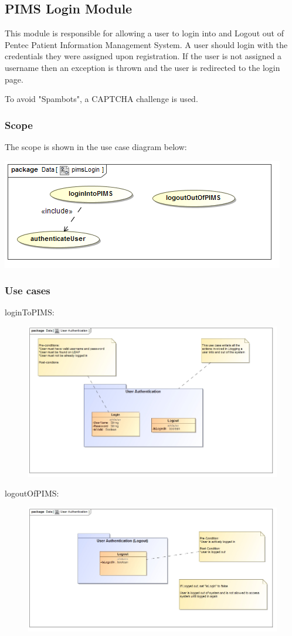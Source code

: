 \subsection{PIMS Login Module}
This module is responsible for allowing a user to login into and Logout out of Pentec Patient Information Management System. A user should login with the credentials they were assigned upon registration. If the user is not assigned a username then an exception is thrown and the user is redirected to the login page. \par 

To avoid "Spambots", a CAPTCHA challenge is used. 

\subsubsection{Scope}
The scope is shown in the use case diagram below: \par
\includegraphics[width=0.75\linewidth]{./Graphics/pimsLogin/pimsLogin}

\subsubsection{Use cases}
\begin{description}
	\item{loginToPIMS:}\hfill 
		\begin{figure}[h!]
			\includegraphics[width=0.7\linewidth]{./Graphics/Login}
		\end{figure}
	\item{logoutOfPIMS:}\hfill
		\begin{figure}[h!]
			\includegraphics[width=0.7\linewidth]{./Graphics/Logout}
		\end{figure}
\end{description}
